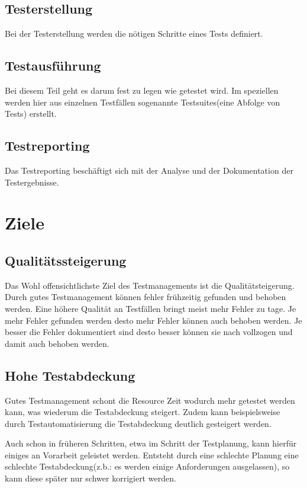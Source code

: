 \section{Testerstellung}
Bei der Testerstellung werden die n\"otigen Schritte eines Tests definiert.  

\section{Testausf\"uhrung}
Bei diesem Teil geht es darum fest zu legen wie getestet wird. Im speziellen werden hier aus einzelnen Testf\"allen sogenannte Testsuites(eine Abfolge von Tests) erstellt.

\section{Testreporting}
Das Testreporting besch\"aftigt sich mit der Analyse und der Dokumentation der Testergebnisse.

\chapter{Ziele}
\section{Qualit\"atssteigerung}
Das Wohl offensichtlichste Ziel des Testmanagements ist die Qualit\"atsteigerung. Durch gutes Testmanagement k\"onnen fehler fr\"uhzeitig gefunden und behoben werden. Eine h\"ohere Qualit\"at an Testf\"allen bringt meist mehr Fehler zu tage. Je mehr Fehler gefunden werden desto mehr Fehler k\"onnen auch behoben werden. Je besser die Fehler dokumentiert sind desto besser k\"onnen sie nach vollzogen und damit auch behoben werden.

\section{Hohe Testabdeckung}
Gutes Testmanagement schont die Resource Zeit wodurch mehr getestet werden kann, was wiederum die Testabdeckung steigert. Zudem kann beispielsweise durch Testautomatisierung die Testabdeckung deutlich gesteigert werden.

Auch schon in fr\"uheren Schritten, etwa im Schritt der Testplanung, kann hierf\"ur einiges an Vorarbeit geleistet werden. Entsteht durch eine schlechte Planung eine schlechte Testabdeckung(z.b.: es werden einige Anforderungen ausgelassen), so kann diese sp\"ater nur schwer korrigiert werden. 

